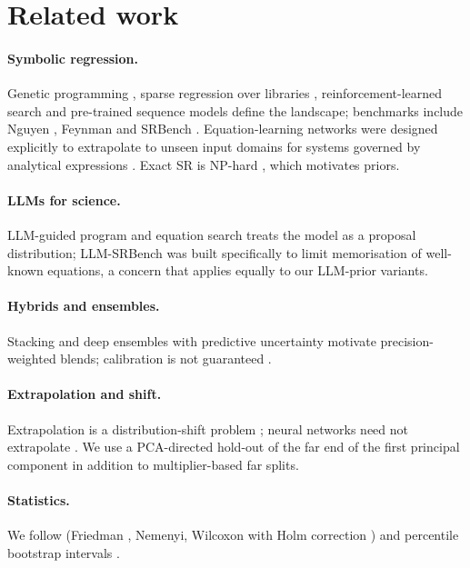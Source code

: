 \section{Related work}
\paragraph{Symbolic regression.} Genetic programming \citep{koza1992gp}, sparse regression over libraries \citep{brunton2016sindy}, reinforcement-learned search \citep{petersen2021dsr} and pre-trained sequence models \citep{biggio2021nsr,kamienny2022e2e} define the landscape; benchmarks include Nguyen \citep{uy2011nguyen}, Feynman \citep{udrescu2020aifeynman} and SRBench \citep{lacava2021srbench}. Equation-learning networks were designed explicitly to extrapolate to unseen input domains for systems governed by analytical expressions \citep{sahoo2018eqldiv}. Exact SR is NP-hard \citep{virgolin2022nphard}, which motivates priors.
\paragraph{LLMs for science.} LLM-guided program and equation search \citep{romeraparedes2024funsearch,shojaee2025llmsr} treats the model as a proposal distribution; LLM-SRBench \citep{shojaee2025llmsrbench} was built specifically to limit memorisation of well-known equations, a concern that applies equally to our LLM-prior variants.
\paragraph{Hybrids and ensembles.} Stacking \citep{wolpert1992stacking} and deep ensembles with predictive uncertainty \citep{lakshminarayanan2017deepensembles} motivate precision-weighted blends; calibration is not guaranteed \citep{guo2017calibration}.
\paragraph{Extrapolation and shift.} Extrapolation is a distribution-shift problem \citep{quinonero2009shift}; neural networks need not extrapolate \citep{xu2021extrapolate,balestriero2021extrapolation}. We use a PCA-directed hold-out of the far end of the first principal component \citep{pearson1901pca} in addition to multiplier-based far splits.
\paragraph{Statistics.} We follow \citet{demsar2006statistical} (Friedman \citep{friedman1937use}, Nemenyi, Wilcoxon \citep{wilcoxon1945ranking} with Holm correction \citep{holm1979simple}) and percentile bootstrap intervals \citep{efron1993bootstrap}.
